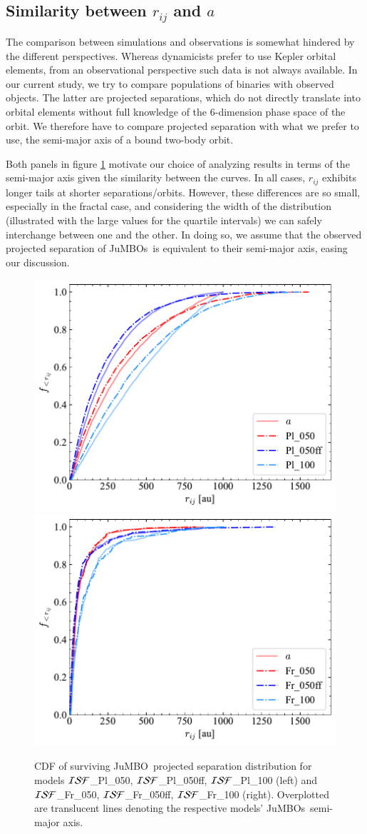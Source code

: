 \documentclass[submission,phys]{lib/SciPost}
\newcommand{\jumbo}{\mbox{JuMBO}}
\newcommand{\jumbos}{\mbox{JuMBOs}}
\begin{document}
\begin{appendix}
  \section{Similarity between $r_{ij}$ and $a$}\label{Appendix:A}

  The comparison between simulations and observations is somewhat
  hindered by the different perspectives. Whereas dynamicists prefer
  to use Kepler orbital elements, from an observational perspective
  such data is not always available. In our current study, we try to
  compare populations of binaries with observed objects. The latter
  are projected separations, which do not directly translate into
  orbital elements without full knowledge of the 6-dimension phase
  space of the orbit. We therefore have to compare projected separation
  with what we prefer to use, the semi-major axis of a bound two-body
  orbit.

  Both panels in figure \ref{Fig:Plummer_rsep} motivate
  our choice of analyzing results in terms of the semi-major axis
  given the similarity between the curves.  In all cases, $r_{ij}$
  exhibits longer tails at shorter separations/orbits. However, these
  differences are so small, especially in the fractal case, and
  considering the width of the distribution (illustrated with the
  large values for the quartile intervals) we can safely interchange
  between one and the other. In doing so, we assume that the observed
  projected separation of \jumbos\, is equivalent to their semi-major
  axis, easing our discussion.
    
    \begin{figure}
    \centering
        \includegraphics[width=0.45\columnwidth]{figures/Plummer_General_proj_sep.pdf}
        \includegraphics[width=0.45\columnwidth]{figures/Fractal_General_proj_sep.pdf}
        \caption{CDF of surviving \jumbo\, projected separation distribution for models 
        ${\cal ISF}$\_Pl\_050, ${\cal ISF}$\_Pl\_050ff, ${\cal ISF}$\_Pl\_100 (left) and 
        ${\cal ISF}$\_Fr\_050, ${\cal ISF}$\_Fr\_050ff, ${\cal ISF}$\_Fr\_100 (right). 
        Overplotted are translucent lines denoting the respective models' \jumbos\, 
        semi-major axis.}
         \label{Fig:Plummer_rsep}
   \end{figure}
\end{appendix}
    
\end{document}
